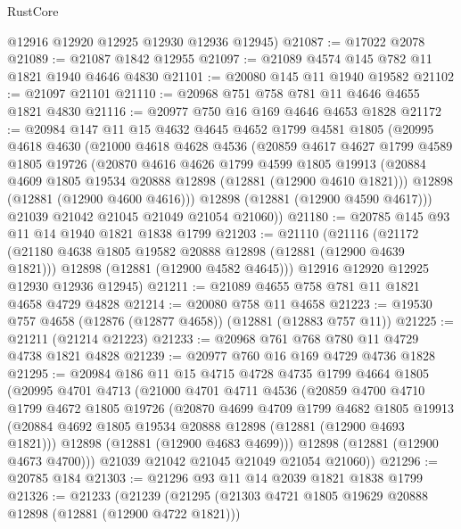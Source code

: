 \begin{lexlean}{RustCore}
\begin{coremodule}
      @12916
      @12920
      @12925
      @12930
      @12936
      @12945)
@21087 := @17022 @2078
@21089 := @21087 @1842 @12955
@21097 := @21089 @4574 @145 @782 @11 @1821 @1940 @4646 @4830
@21101 := @20080 @145 @11 @1940 @19582
@21102 := @21097 @21101
@21110 := @20968 @751 @758 @781 @11 @4646 @4655 @1821 @4830
@21116 := @20977 @750 @16 @169 @4646 @4653 @1828
@21172 := @20984
    @147
    @11
    @15
    @4632
    @4645
    @4652
    @1799
    @4581
    @1805
    (@20995
      @4618
      @4630
      (@21000
        @4618
        @4628
        @4536
        (@20859
          @4617
          @4627
          @1799
          @4589
          @1805
          @19726
          (@20870
            @4616
            @4626
            @1799
            @4599
            @1805
            @19913
            (@20884 @4609 @1805 @19534 @20888 @12898 (@12881 (@12900 @4610 @1821)))
            @12898
            (@12881 (@12900 @4600 @4616)))
          @12898
          (@12881 (@12900 @4590 @4617)))
        @21039
        @21042
        @21045
        @21049
        @21054
        @21060))
@21180 := @20785 @145 @93 @11 @14 @1940 @1821 @1838 @1799
@21203 := @21110
    (@21116
      (@21172
        (@21180 @4638 @1805 @19582 @20888 @12898 (@12881 (@12900 @4639 @1821)))
        @12898
        (@12881 (@12900 @4582 @4645)))
      @12916
      @12920
      @12925
      @12930
      @12936
      @12945)
@21211 := @21089 @4655 @758 @781 @11 @1821 @4658 @4729 @4828
@21214 := @20080 @758 @11 @4658
@21223 := @19530 @757 @4658 (@12876 (@12877 @4658)) (@12881 (@12883 @757 @11))
@21225 := @21211 (@21214 @21223)
@21233 := @20968 @761 @768 @780 @11 @4729 @4738 @1821 @4828
@21239 := @20977 @760 @16 @169 @4729 @4736 @1828
@21295 := @20984
    @186
    @11
    @15
    @4715
    @4728
    @4735
    @1799
    @4664
    @1805
    (@20995
      @4701
      @4713
      (@21000
        @4701
        @4711
        @4536
        (@20859
          @4700
          @4710
          @1799
          @4672
          @1805
          @19726
          (@20870
            @4699
            @4709
            @1799
            @4682
            @1805
            @19913
            (@20884 @4692 @1805 @19534 @20888 @12898 (@12881 (@12900 @4693 @1821)))
            @12898
            (@12881 (@12900 @4683 @4699)))
          @12898
          (@12881 (@12900 @4673 @4700)))
        @21039
        @21042
        @21045
        @21049
        @21054
        @21060))
@21296 := @20785 @184
@21303 := @21296 @93 @11 @14 @2039 @1821 @1838 @1799
@21326 := @21233
    (@21239
      (@21295
        (@21303 @4721 @1805 @19629 @20888 @12898 (@12881 (@12900 @4722 @1821)))

\end{coremodule}
\end{lexlean}
